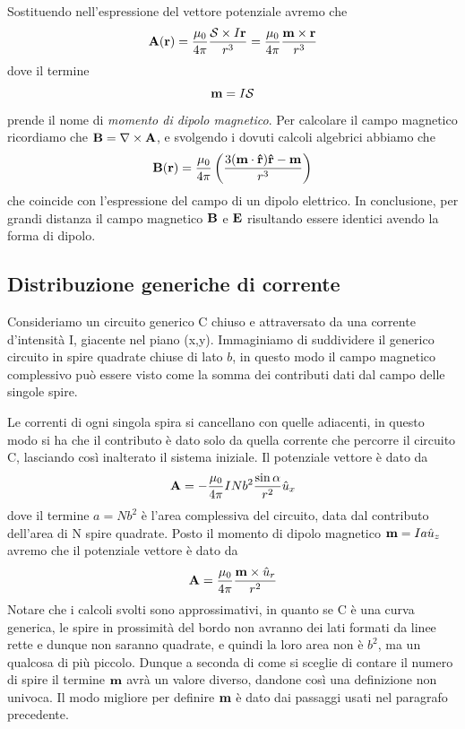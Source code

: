 Sostituendo nell'espressione del vettore potenziale avremo che 
\begin{equation*}
	\bold{A}(\bold{r}) = \frac{\mu_0}{4 \pi} \frac{\mathcal{S} \times I\bold{r}}{r^3} = \frac{\mu_0}{4 \pi} \frac{\bold{m}\times \bold{r}}{r^3}
\end{equation*}
dove il termine 
\begin{equation}
	\bold{m} = I \mathcal{S} 
\end{equation}
prende il nome di \textit{momento di dipolo magnetico}. Per calcolare il campo magnetico ricordiamo che $\bold{B} = \nabla \times \bold{A}$, e svolgendo i dovuti calcoli algebrici abbiamo che
\begin{equation*}
	\bold{B}(\bold{r}) = \frac{\mu_0}{4 \pi} \left ( \frac{3(\bold{m} \cdot \bold{\hat{r}})\bold{\hat{r}} - \bold{m}}{r^3}\right)
\end{equation*}
che coincide con l'espressione del campo di un dipolo elettrico. In conclusione, per grandi distanza il campo magnetico $\bold{B}$ e $\bold{E}$ risultando essere identici avendo la forma di dipolo.

\subsection{Distribuzione generiche di corrente}
Consideriamo un circuito generico C chiuso e attraversato da una corrente d'intensit\`a I, giacente nel piano (x,y). Immaginiamo di suddividere il generico circuito in spire quadrate chiuse di lato $b$, in questo modo il campo magnetico complessivo pu\`o essere visto come la somma dei contributi dati dal campo delle singole spire. 

Le correnti di ogni singola spira si cancellano con quelle adiacenti, in questo modo si ha che il contributo \`e dato solo da quella corrente che percorre il circuito C, lasciando cos\`i inalterato il sistema iniziale. Il potenziale vettore \`e dato da 
\begin{equation*}
	\bold{A} = - \frac{\mu_0 }{4 \pi }INb^2\frac{\sin \alpha}{r^2} \hat{u}_x
\end{equation*}
dove il termine $a = Nb^2$ \`e l'area complessiva del circuito, data dal contributo dell'area di N spire quadrate. Posto il momento di dipolo magnetico $\bold{m} = Ia\hat{u}_z$ avremo che il potenziale vettore \`e dato da 
\begin{equation*}
	\bold{A} = \frac{\mu_0}{4\pi} \frac{\bold{m} \times \hat{u}_r}{r^2}
\end{equation*}
Notare che i calcoli svolti sono approssimativi, in quanto se C \`e una curva generica, le spire in prossimit\`a del bordo non avranno dei lati formati da linee rette e dunque non saranno quadrate, e quindi la loro area non \`e $b^2$, ma un qualcosa di pi\`u piccolo. Dunque a seconda di come si sceglie di contare il numero di spire il termine $\bold{m}$ avr\`a un valore diverso, dandone cos\`i una definizione non univoca. Il modo migliore per definire $\bold{m}$ \`e dato dai passaggi usati nel paragrafo precedente. 

